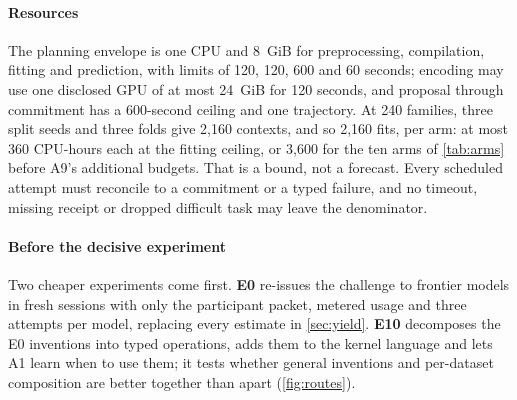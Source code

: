 \paragraph{Resources} The planning envelope is one CPU and 8~GiB for preprocessing, compilation,
fitting and prediction, with limits of 120, 120, 600 and 60 seconds; encoding may use one disclosed
GPU of at most 24~GiB for 120 seconds, and proposal through commitment has a 600-second ceiling and
one trajectory. At 240 families, three split seeds and three folds give 2,160 contexts, and so 2,160
fits, per arm: at most 360 CPU-hours each at the fitting ceiling, or 3,600 for the ten arms of
\cref{tab:arms} before A9's additional budgets. That is a bound, not a forecast.
Every scheduled attempt must reconcile to a commitment or a typed failure, and no timeout, missing
receipt or dropped difficult task may leave the denominator.

\paragraph{Before the decisive experiment} Two cheaper experiments come first. \textbf{E0} re-issues
the challenge to frontier models in fresh sessions with only the participant packet, metered usage
and three attempts per model, replacing every estimate in \cref{sec:yield}. \textbf{E10} decomposes
the E0 inventions into typed operations, adds them to the kernel language and lets A1 learn when to
use them; it tests whether general inventions and per-dataset composition are better together than
apart (\cref{fig:routes}).
